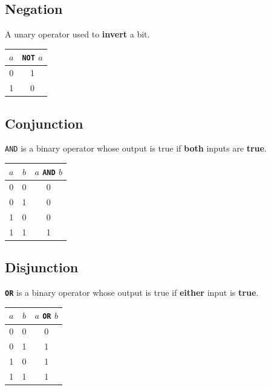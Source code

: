 \documentclass[a4paper]{report}
\newcommand{\keywordinline}[1]{\textcolor[rgb]{0.00,0.50,0.00}{\textbf{\texttt{#1}}}}
\begin{document}
\subsection{Negation}
A unary operator used to \textbf{invert} a bit.
\begin{table}[H]
    \centering
    \begin{tabular}{c c}
        \toprule
        \textbf{\(a\)} & \keywordinline{NOT} \(a\) \\
        \midrule
        0              & 1                         \\
        1              & 0                         \\
        \bottomrule
    \end{tabular}
\end{table}
\subsection{Conjunction}
\texttt{AND} is a binary operator whose output is true if \textbf{both} inputs are \textbf{true}.
\begin{table}[H]
    \centering
    \begin{tabular}{c c c}
        \toprule
        \textbf{\(a\)} & \textbf{\(b\)} & \textbf{\(a\) \texttt{AND} \(b\)} \\
        \midrule
        0              & 0              & 0                                           \\
        0              & 1              & 0                                           \\
        1              & 0              & 0                                           \\
        1              & 1              & 1                                           \\
        \bottomrule
    \end{tabular}
\end{table}
\subsection{Disjunction}
\keywordinline{OR} is a binary operator whose output is true if \textbf{either} input is \textbf{true}.
\begin{table}[H]
    \centering
    \begin{tabular}{c c c}
        \toprule
        \textbf{\(a\)} & \textbf{\(b\)} & \(a\) \keywordinline{OR} \(b\) \\
        \midrule
        0              & 0              & 0                              \\
        0              & 1              & 1                              \\
        1              & 0              & 1                              \\
        1              & 1              & 1                              \\
        \bottomrule
    \end{tabular}
\end{table}
\end{document}
